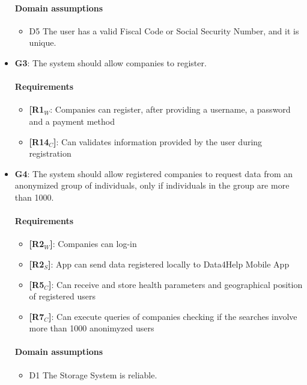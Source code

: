 \begin{itemize}
   \paragraph{Domain assumptions}
   \begin{itemize}
    \item  D5  The user has a valid Fiscal Code or Social Security Number, and it is unique.
   \end{itemize}
   
    \item \textbf{G3}: The system should allow companies to register.
    \paragraph{Requirements}
   \begin{itemize}
    \item \textbf{[R1$_W$}: Companies can register, after providing a username, a password and a payment method
    \item \textbf{[R14$_C$]}: Can validates information provided by the user during registration
   \end{itemize}
   
   
    \item \textbf{G4}: The system should allow registered companies to request data from an anonymized group of individuals, only if individuals in the group are more than 1000.
    \paragraph{Requirements}
   \begin{itemize}
    \item \textbf{[R2$_W$]}: Companies can log-in
    \item \textbf{[R2$_S$]}: App can send data registered locally to Data4Help Mobile App
    \item \textbf{[R5$_C$]}: Can receive and store health parameters and geographical position of registered users
    \item \textbf{[R7$_C$]}: Can execute queries of companies checking if the searches involve more than 1000 anonimyzed users
   \end{itemize}
   \paragraph{Domain assumptions}
   \begin{itemize}
    \item  D1  The Storage System is reliable.
   \end{itemize}
   

\end{itemize}
